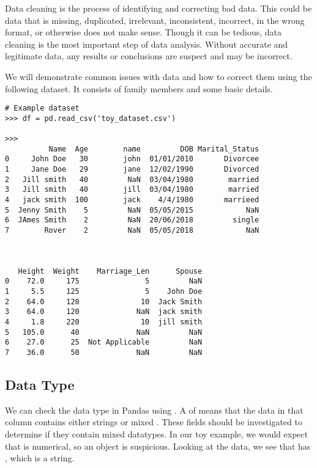 
Data cleaning is the process of identifying and correcting bad data.
This could be data that is missing, duplicated, irrelevant, inconsistent, incorrect, in the wrong format, or otherwise does not make sense.
Though it can be tedious, data cleaning is the most important step of data analysis.
Without accurate and legitimate data, any results or conclusions are suspect and may be incorrect.

We will demonstrate common issues with data and how to correct them using the following dataset.
It consists of family members and some basic details.

\begin{lstlisting}
# Example dataset
>>> df = pd.read_csv('toy_dataset.csv')

>>>
          Name  Age        name         DOB Marital_Status
0     John Doe   30        john  01/01/2010       Divorcee
1     Jane Doe   29    	   jane	 12/02/1990       Divorced
2   Jill smith   40         NaN  03/04/1980        married
3   Jill smith   40  	   jill  03/04/1980        married
4   jack smith  100        jack    4/4/1980       marrieed
5  Jenny Smith    5         NaN  05/05/2015            NaN
6  JAmes Smith    2         NaN  20/06/2018         single
7        Rover    2         NaN  05/05/2018            NaN



   Height  Weight    Marriage_Len      Spouse
0    72.0     175               5         NaN
1     5.5     125               5    John Doe
2    64.0     120              10  Jack Smith
3    64.0     120             NaN  jack smith
4     1.8     220              10  jill smith
5   105.0      40             NaN         NaN
6    27.0      25  Not Applicable         NaN
7    36.0      50             NaN         NaN

\end{lstlisting}



\subsection*{Data Type}

We can check the data type in Pandas using .
A  of  means that the data in that column contains either strings or mixed . 
These fields should be investigated to determine if they contain mixed datatypes.
In our toy example, we would expect that  is numerical, so an object  is suspicious. 
Looking at the data, we see that  has , which is a string.


